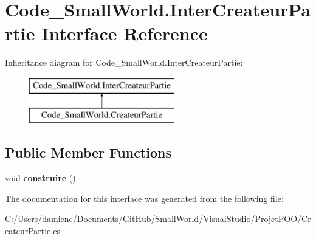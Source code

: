 \hypertarget{interface_code___small_world_1_1_inter_createur_partie}{\section{Code\-\_\-\-Small\-World.\-Inter\-Createur\-Partie Interface Reference}
\label{interface_code___small_world_1_1_inter_createur_partie}
}
Inheritance diagram for Code\-\_\-\-Small\-World.\-Inter\-Createur\-Partie\-:\begin{figure}[H]
\begin{center}
\leavevmode
\includegraphics[height=2.000000cm]{interface_code___small_world_1_1_inter_createur_partie}
\end{center}
\end{figure}
\subsection*{Public Member Functions}
\begin{DoxyCompactItemize}
\item 
\hypertarget{interface_code___small_world_1_1_inter_createur_partie_a79e52693285229577bda38121484e779}{void {\bfseries construire} ()}\label{interface_code___small_world_1_1_inter_createur_partie_a79e52693285229577bda38121484e779}

\end{DoxyCompactItemize}


The documentation for this interface was generated from the following file\-:\begin{DoxyCompactItemize}
\item 
C\-:/\-Users/damienc/\-Documents/\-Git\-Hub/\-Small\-World/\-Visual\-Studio/\-Projet\-P\-O\-O/Createur\-Partie.\-cs\end{DoxyCompactItemize}
